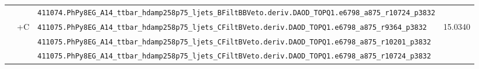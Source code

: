 \begin{table}[htbp]
{\begin{tabular}{ll|l|r}
                                                         &                                & \verb|411074.PhPy8EG_A14_ttbar_hdamp258p75_ljets_BFiltBBVeto.deriv.DAOD_TOPQ1.e6798_a875_r10724_p3832|  &  \\ \cline{2-4}
                                                         & \multirow{3}{*}{\ttbar{}+C}    & \verb|411075.PhPy8EG_A14_ttbar_hdamp258p75_ljets_CFiltBVeto.deriv.DAOD_TOPQ1.e6798_a875_r9364_p3832|    &  \multirow{3}{*}{15.0340} \\
                                                         &                                & \verb|411075.PhPy8EG_A14_ttbar_hdamp258p75_ljets_CFiltBVeto.deriv.DAOD_TOPQ1.e6798_a875_r10201_p3832|   &  \\
                                                         &                                & \verb|411075.PhPy8EG_A14_ttbar_hdamp258p75_ljets_CFiltBVeto.deriv.DAOD_TOPQ1.e6798_a875_r10724_p3832|   &  \\ \hline


\end{tabular}}
\end{table}
